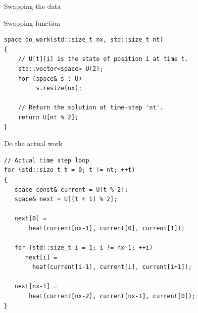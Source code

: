 \documentclass[\classoption]{beamer}
\begin{document}
\begin{frame}[fragile]{Swapping the data}
\vspace{-0.5cm}
\begin{center}
\end{center}

\begin{block}{Swapping function}
\begin{lstlisting}
space do_work(std::size_t nx, std::size_t nt)
{
    // U[t][i] is the state of position i at time t.
    std::vector<space> U(2);
    for (space& s : U)
         s.resize(nx);

    // Return the solution at time-step 'nt'.
    return U[nt % 2];
}
\end{lstlisting}
\end{block}
\end{frame}

\begin{frame}[fragile]{Do the actual work}

\begin{lstlisting}
// Actual time step loop
for (std::size_t t = 0; t != nt; ++t)
{
   space const& current = U[t % 2];
   space& next = U[(t + 1) % 2];

   next[0] = 
       heat(current[nx-1], current[0], current[1]);

   for (std::size_t i = 1; i != nx-1; ++i)
      next[i] = 
      	heat(current[i-1], current[i], current[i+1]);

   next[nx-1] = 
       heat(current[nx-2], current[nx-1], current[0]);
}
\end{lstlisting}


\end{frame}
\end{document}
